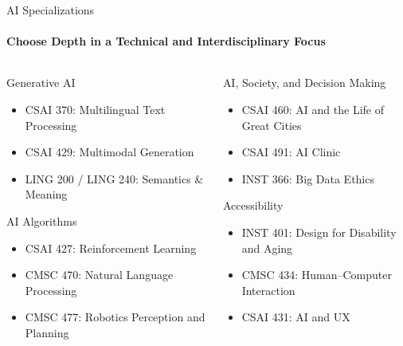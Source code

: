 \documentclass[compress]{beamer}
\begin{document}
\begin{frame}{AI Specializations}
\framesubtitle{Choose Depth in a Technical and Interdisciplinary Focus}
\begin{columns}
  \begin{column}{0.48\textwidth}
    \begin{block}{Generative AI}
      \begin{itemize}
        \item CSAI 370: Multilingual Text Processing  
        \item CSAI 429: Multimodal Generation  
        \item LING 200 / LING 240: Semantics & Meaning
      \end{itemize}
    \end{block}

    \begin{block}{AI Algorithms}
      \begin{itemize}
        \item CSAI 427: Reinforcement Learning  
        \item CMSC 470: Natural Language Processing  
        \item CMSC 477: Robotics Perception and Planning
      \end{itemize}
    \end{block}
  \end{column}

  \begin{column}{0.48\textwidth}
    \begin{block}{AI, Society, and Decision Making}
      \begin{itemize}
        \item CSAI 460: AI and the Life of Great Cities  
        \item CSAI 491: AI Clinic  
        \item INST 366: Big Data Ethics
      \end{itemize}
    \end{block}

    \begin{block}{Accessibility}
      \begin{itemize}
        \item INST 401: Design for Disability and Aging  
        \item CMSC 434: Human–Computer Interaction  
        \item CSAI 431: AI and UX
      \end{itemize}
    \end{block}
  \end{column}
\end{columns}
\end{frame}
\end{document}
